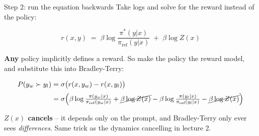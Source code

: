\documentclass[aspectratio=169]{beamer}
\begin{document}
\begin{frame}{Step 2: run the equation backwards}
  \small
  Take logs and solve for the reward instead of the policy:

  \vskip 3pt
  \begin{center}
  \begin{tcolorbox}[colback=lightbg, colframe=popblue, boxrule=0.7pt, arc=2pt, width=0.84\textwidth]
    \[ r(x,y) \;=\; \beta \log \frac{\pi^*(y|x)}{\pi_{\text{ref}}(y|x)} \;+\; \beta \log Z(x) \]
  \end{tcolorbox}
  \end{center}

  \vskip 4pt
  \begin{center}
    \small
    \textbf{Any} policy implicitly defines a reward. So make the policy the reward model, and
    substitute this into Bradley-Terry:
  \end{center}

  \vskip 3pt
  \begin{tcolorbox}[colback=paramgreen!8, colframe=paramgreen, boxrule=0.7pt, arc=2pt]
    \scriptsize
    \begin{align*}
      P(y_w \succ y_l) &= \sigma\big( r(x,y_w) - r(x,y_l) \big) \\[2pt]
      &= \sigma\Big( \beta \log \tfrac{\pi(y_w|x)}{\pi_{\text{ref}}(y_w|x)} + \cancel{\beta \log Z(x)}
                   - \beta \log \tfrac{\pi(y_l|x)}{\pi_{\text{ref}}(y_l|x)} - \cancel{\beta \log Z(x)} \Big)
    \end{align*}
  \end{tcolorbox}

  \vskip 3pt
  \begin{center}
    \footnotesize
    \textbf{$Z(x)$ cancels} -- it depends only on the prompt, and Bradley-Terry only ever sees
    \emph{differences}. Same trick as the dynamics cancelling in lecture 2.
  \end{center}
\end{frame}
\end{document}

